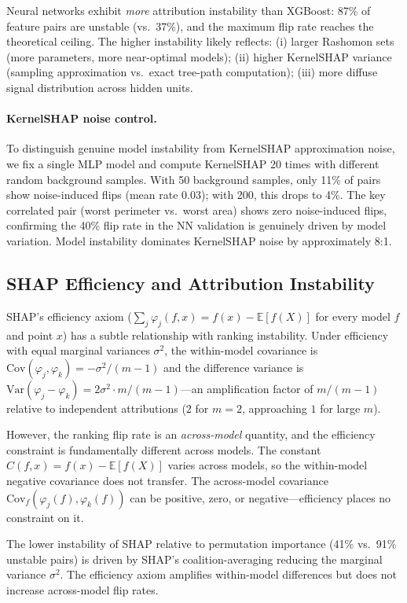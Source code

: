 \documentclass{jmlr}
\newcommand{\E}{\mathbb{E}}
\newcommand{\Var}{\mathrm{Var}}
\begin{document}
Neural networks exhibit \emph{more} attribution instability than XGBoost: 87\% of feature pairs are unstable (vs.\ 37\%), and the maximum flip rate reaches the theoretical ceiling. The higher instability likely reflects: (i) larger Rashomon sets (more parameters, more near-optimal models); (ii) higher KernelSHAP variance (sampling approximation vs.\ exact tree-path computation); (iii) more diffuse signal distribution across hidden units.

\paragraph{KernelSHAP noise control.}
To distinguish genuine model instability from KernelSHAP approximation noise, we fix a single MLP model and compute KernelSHAP 20 times with different random background samples. With 50 background samples, only 11\% of pairs show noise-induced flips (mean rate 0.03); with 200, this drops to 4\%. The key correlated pair (worst perimeter vs.\ worst area) shows zero noise-induced flips, confirming the 40\% flip rate in the NN validation is genuinely driven by model variation. Model instability dominates KernelSHAP noise by approximately 8:1.

\subsection{SHAP Efficiency and Attribution Instability}

SHAP's efficiency axiom ($\sum_j \varphi_j(f,x) = f(x) - \E[f(X)]$ for every model $f$ and point $x$) has a subtle relationship with ranking instability. Under efficiency with equal marginal variances $\sigma^2$, the within-model covariance is $\text{Cov}(\varphi_j, \varphi_k) = -\sigma^2/(m-1)$ and the difference variance is $\Var(\varphi_j - \varphi_k) = 2\sigma^2 \cdot m/(m-1)$---an amplification factor of $m/(m-1)$ relative to independent attributions ($2$ for $m=2$, approaching $1$ for large $m$).

However, the ranking flip rate is an \emph{across-model} quantity, and the efficiency constraint is fundamentally different across models. The constant $C(f,x) = f(x) - \E[f(X)]$ varies across models, so the within-model negative covariance does not transfer. The across-model covariance $\text{Cov}_f(\varphi_j(f), \varphi_k(f))$ can be positive, zero, or negative---efficiency places no constraint on it.

The lower instability of SHAP relative to permutation importance (41\% vs.\ 91\% unstable pairs) is driven by SHAP's coalition-averaging reducing the marginal variance $\sigma^2$. The efficiency axiom amplifies within-model differences but does not increase across-model flip rates.
\end{document}
